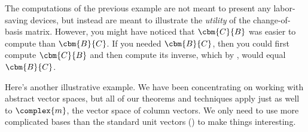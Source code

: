 %
The computations of the previous example are not meant to present any labor-saving devices, but instead are meant to illustrate the {\em utility} of the change-of-basis matrix.  However, you might have noticed that $\cbm{C}{B}$ was easier to compute than $\cbm{B}{C}$.  If you needed $\cbm{B}{C}$, then you could first compute $\cbm{C}{B}$ and then compute its inverse, which by , would equal $\cbm{B}{C}$.\par
%
Here's another illustrative example.  We have been concentrating on working with abstract vector spaces, but all of our theorems and techniques apply just as well to $\complex{m}$, the vector space of column vectors.  We only need to use more complicated bases than the standard unit vectors () to make things interesting.\par
%
